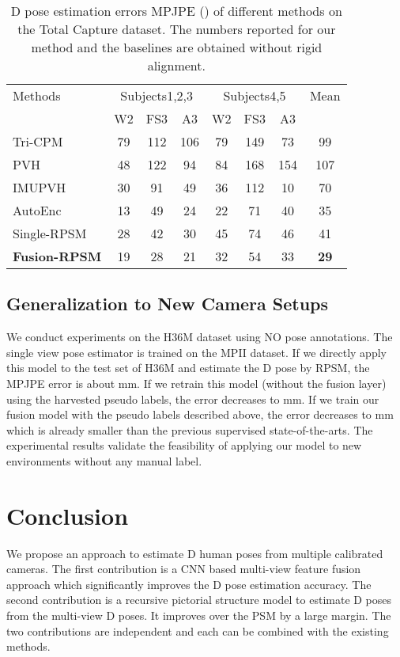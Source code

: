 \documentclass[10pt,twocolumn,letterpaper]{article}
\begin{document}
\begin{table}[]
\center
\small
\caption{D pose estimation errors MPJPE () of different methods on the Total Capture dataset. The numbers reported for our method and the baselines are obtained without rigid alignment.}
\label{table:totalcapture}
\scriptsize{
\begin{tabular}{l c c c  c c c c}
\toprule
Methods & \multicolumn{3}{c}{Subjects1,2,3} & \multicolumn{3}{c}{Subjects4,5} & Mean\\
& W2 & FS3 & A3 & W2 & FS3 & A3 &  \\
\hline
Tri-CPM \cite{wei2016convolutional} & 79 & 112 & 106 & 79 & 149 & 73 & 99\\
PVH \cite{trumble2017total} & 48 & 122 & 94 & 84 & 168 & 154 & 107 \\
IMUPVH \cite{trumble2017total} & 30 & 91 & 49 & 36 & 112 & 10 & 70\\
AutoEnc \cite{trumble2018deep} & 13 & 49 & 24 & 22 & 71 & 40 & 35 \\
\hline
Single-RPSM & 28 &	42 & 30 & 45 & 74 & 46 & 41\\
\textbf{Fusion-RPSM} & 19 &	28 & 21 & 32 & 54 & 33 & \textbf{29}\\
\toprule
\end{tabular}
}
\end{table}

\subsection{Generalization to New Camera Setups}
We conduct experiments on the H36M dataset using NO pose annotations. The single view pose estimator \cite{simplebaselines} is trained on the MPII dataset. If we directly apply this model to the test set of H36M and estimate the D pose by RPSM, the MPJPE error is about mm. If we retrain this model (without the fusion layer) using the harvested pseudo labels, the error decreases to mm. If we train our fusion model with the pseudo labels described above, the error decreases to mm which is already smaller than the previous supervised state-of-the-arts. The experimental results validate the feasibility of applying our model to new environments without any manual label. 

\section{Conclusion}
We propose an approach to estimate D human poses from multiple calibrated cameras. The first contribution is a CNN based multi-view feature fusion approach which significantly improves the D pose estimation accuracy. The second contribution is a recursive pictorial structure model to estimate D poses from the multi-view D poses. It improves over the PSM by a large margin. The two contributions are independent and each can be combined with the existing methods.

{\small


}
\end{document}
